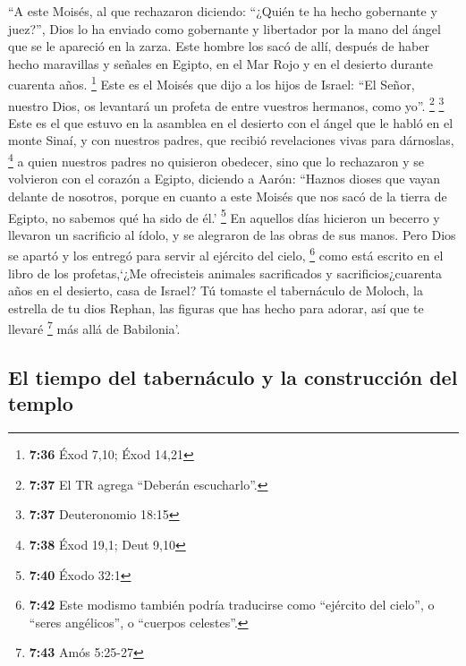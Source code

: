 \begin{paracol}{2}
 ``A este Moisés, al que rechazaron diciendo: ``¿Quién te
ha hecho gobernante y juez?'', Dios lo ha enviado como gobernante y
libertador por la mano del ángel que se le apareció en la zarza.
 Este hombre los sacó de allí, después de haber hecho
maravillas y señales en Egipto, en el Mar Rojo y en el desierto durante
cuarenta años. \footnote{\textbf{7:36} Éxod 7,10; Éxod 14,21}
 Este es el Moisés que dijo a los hijos de Israel: ``El
Señor, nuestro Dios, os levantará un profeta de entre vuestros hermanos,
como yo''. \footnote{\textbf{7:37} El TR agrega ``Deberán escucharlo''.}
\footnote{\textbf{7:37} Deuteronomio 18:15}  Este es el
que estuvo en la asamblea en el desierto con el ángel que le habló en el
monte Sinaí, y con nuestros padres, que recibió revelaciones vivas para
dárnoslas, \footnote{\textbf{7:38} Éxod 19,1; Deut 9,10} 
a quien nuestros padres no quisieron obedecer, sino que lo rechazaron y
se volvieron con el corazón a Egipto,  diciendo a Aarón:
``Haznos dioses que vayan delante de nosotros, porque en cuanto a este
Moisés que nos sacó de la tierra de Egipto, no sabemos qué ha sido de
él.' \footnote{\textbf{7:40} Éxodo 32:1}  En aquellos
días hicieron un becerro y llevaron un sacrificio al ídolo, y se
alegraron de las obras de sus manos.  Pero Dios se apartó
y los entregó para servir al ejército del cielo, \footnote{\textbf{7:42}
  Este modismo también podría traducirse como ``ejército del cielo'', o
  ``seres angélicos'', o ``cuerpos celestes''.} como está escrito en el
libro de los profetas,`¿Me ofrecisteis animales sacrificados y
sacrificios¿cuarenta años en el desierto, casa de Israel?
 Tú tomaste el tabernáculo de Moloch, la estrella de tu
dios Rephan, las figuras que has hecho para adorar, así que te llevaré
\footnote{\textbf{7:43} Amós 5:25-27} más allá de Babilonia'.

\hypertarget{el-tiempo-del-tabernuxe1culo-y-la-construcciuxf3n-del-templo}{%
\subsection{El tiempo del tabernáculo y la construcción del
templo}\label{el-tiempo-del-tabernuxe1culo-y-la-construcciuxf3n-del-templo}}


\end{paracol}
